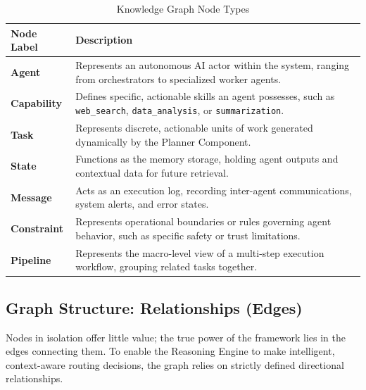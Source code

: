 \begin{table}[ht!]
    \centering
    \caption{Knowledge Graph Node Types}
    \label{tab:node_types}
    \begin{tabular}{|p{}|p{}|}
        \hline
        \textbf{Node Label} & \textbf{Description} \\
        \hline
        \textbf{Agent} & Represents an autonomous AI actor within the system, ranging from orchestrators to specialized worker agents. \\
        \hline
        \textbf{Capability} & Defines specific, actionable skills an agent possesses, such as \texttt{web\_search}, \texttt{data\_analysis}, or \texttt{summarization}. \\
        \hline
        \textbf{Task} & Represents discrete, actionable units of work generated dynamically by the Planner Component. \\
        \hline
        \textbf{State} & Functions as the memory storage, holding agent outputs and contextual data for future retrieval. \\
        \hline
        \textbf{Message} & Acts as an execution log, recording inter-agent communications, system alerts, and error states. \\
        \hline
        \textbf{Constraint} & Represents operational boundaries or rules governing agent behavior, such as specific safety or trust limitations. \\
        \hline
        \textbf{Pipeline} & Represents the macro-level view of a multi-step execution workflow, grouping related tasks together. \\
        \hline
    \end{tabular}
\end{table}

\subsection{Graph Structure: Relationships (Edges)}
Nodes in isolation offer little value; the true power of the framework lies in the edges connecting them. To enable the Reasoning Engine to make intelligent, context-aware routing decisions, the graph relies on strictly defined directional relationships.


